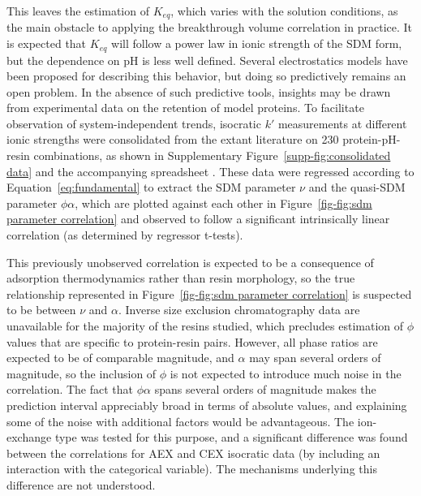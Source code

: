 \documentclass[preprint,review,12pt]{elsarticle}
\begin{document}
        This leaves the estimation of $K_{eq}$, which varies with the solution conditions, as the main obstacle to applying the breakthrough volume correlation in practice. It is expected that $K_{eq}$ will follow a power law in ionic strength of the SDM form, but the dependence on pH is less well defined. Several electrostatics models have been proposed for describing this behavior, but doing so predictively remains an open problem. In the absence of such predictive tools, insights may be drawn from experimental data on the retention of model proteins. To facilitate observation of system-independent trends, isocratic $k'$ measurements at different ionic strengths were consolidated from the extant literature on 230 protein-pH-resin combinations, as shown in Supplementary Figure~\ref{supp-fig:consolidated data} and the accompanying spreadsheet \cite{Staby2000, Staby2001, Staby2004, Staby2005, Staby2006, Staby2007, DePhillips2001, DePhillips2004, Kumar2015, bai1999}. These data were regressed according to Equation~\ref{eq:fundamental} to extract the SDM parameter $\nu$ and the quasi-SDM parameter $\phi \alpha$, which are plotted against each other in Figure~\ref{fig-fig:sdm parameter correlation} and observed to follow a significant intrinsically linear correlation (as determined by regressor t-tests).


        This previously unobserved correlation is expected to be a consequence of adsorption thermodynamics rather than resin morphology, so the true relationship represented in Figure~\ref{fig-fig:sdm parameter correlation} is suspected to be between $\nu$ and $\alpha$. Inverse size exclusion chromatography data are unavailable for the majority of the resins studied, which precludes estimation of $\phi$ values that are specific to protein-resin pairs. However, all phase ratios are expected to be of comparable magnitude, and $\alpha$ may span several orders of magnitude, so the inclusion of $\phi$ is not expected to introduce much noise in the correlation. The fact that $\phi \alpha$ spans several orders of magnitude makes the prediction interval appreciably broad in terms of absolute values, and explaining some of the noise with additional factors would be advantageous. The ion-exchange type was tested for this purpose, and a significant difference was found between the correlations for AEX and CEX isocratic data (by including an interaction with the categorical variable). The mechanisms underlying this difference are not understood.
\end{document}

